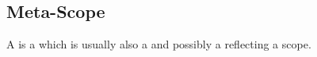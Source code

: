 \subsection{Meta-Scope}
\label{concept-Meta-Scope}

A  is a  which is usually also a 
and possibly a  reflecting a scope.



